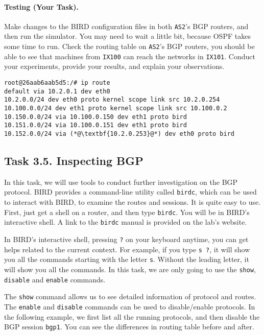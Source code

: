 \paragraph{Testing (Your Task).} Make changes to the BIRD configuration files 
in both \texttt{AS2}'s BGP routers, and then run the simulator.  
You may need to wait a little bit, because OSPF takes some time to 
run. Check the routing table on 
\texttt{AS2}'s BGP routers, you should be able to see
that machines from \texttt{IX100} can reach
the networks in \texttt{IX101}. Conduct your experiments,
provide your results, and explain your observations.  


\begin{lstlisting}
root@26aab6aab5d5:/# ip route
default via 10.2.0.1 dev eth0
10.2.0.0/24 dev eth0 proto kernel scope link src 10.2.0.254
10.100.0.0/24 dev eth1 proto kernel scope link src 10.100.0.2
10.150.0.0/24 via 10.100.0.150 dev eth1 proto bird
10.151.0.0/24 via 10.100.0.151 dev eth1 proto bird
10.152.0.0/24 via (*@\textbf{10.2.0.253}@*) dev eth0 proto bird
\end{lstlisting}
 


\subsection{Task 3.5. Inspecting BGP}

In this task, we will use tools to conduct 
further investigation on the BGP protocol. 
BIRD provides a command-line utility called \texttt{birdc}, which can be used
to interact with BIRD, to examine the routes and sessions. 
It is quite easy to use. First, just get a shell on
a router, and then type \texttt{birdc}. You will be in BIRD's interactive shell. 
A link to the \texttt{birdc} manual is provided on the lab's website.  


In BIRD's interactive shell, pressing \texttt{?} on your keyboard anytime, you
can get helps related to the current context. For example, if you type
\texttt{s ?}, it will show you all the commands starting with the letter \texttt{s}. 
Without the leading letter, it will show you all the commands. 
In this task, we are only going to use the \texttt{show}, \texttt{disable} and \texttt{enable}
commands. 

The \texttt{show} command allows us to see detailed information of protocol and routes. 
The \texttt{enable} and \texttt{disable} commands can be used to disable/enable 
protocols. In the following example, we first list all the running protocols,
and then disable the BGP session \texttt{bgp1}. You can see the differences
in routing table before and after.

